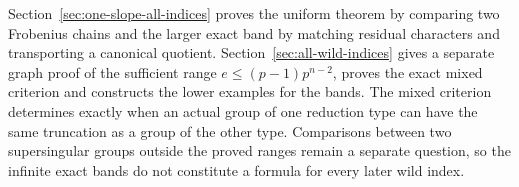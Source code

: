 Section~\ref{sec:one-slope-all-indices} proves the uniform theorem by comparing two Frobenius chains and the larger exact band by matching residual characters and transporting a canonical quotient. Section~\ref{sec:all-wild-indices} gives a separate graph proof of the sufficient range $e\le(p-1)p^{n-2}$, proves the exact mixed criterion and constructs the lower examples for the bands. The mixed criterion determines exactly when an actual group of one reduction type can have the same truncation as a group of the other type. Comparisons between two supersingular groups outside the proved ranges remain a separate question, so the infinite exact bands do not constitute a formula for every later wild index.

